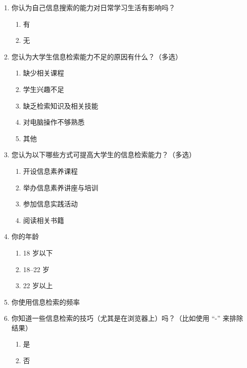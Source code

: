 \begin{enumerate}[leftmargin=*]
    \item 你认为自己信息搜索的能力对日常学习生活有影响吗？
      \begin{enumerate}[label=\Alph*., itemsep=0pt]
        \item 有
        \item 无
      \end{enumerate}

    \item 您认为大学生信息检索能力不足的原因有什么？（多选）
      \begin{enumerate}[label=\Alph*., itemsep=0pt]
        \item 缺少相关课程
        \item 学生兴趣不足
        \item 缺乏检索知识及相关技能
        \item 对电脑操作不够熟悉
        \item 其他
      \end{enumerate}

    \item 您认为以下哪些方式可提高大学生的信息检索能力？（多选）
      \begin{enumerate}[label=\Alph*., itemsep=0pt]
        \item 开设信息素养课程
        \item 举办信息素养讲座与培训
        \item 参加信息实践活动
        \item 阅读相关书籍
      \end{enumerate}

    \item 你的年龄
      \begin{enumerate}[label=\Alph*., itemsep=0pt]
        \item 18 岁以下
        \item 18–22 岁
        \item 22 岁以上
      \end{enumerate}

    \item 你使用信息检索的频率

    \item 你知道一些信息检索的技巧（尤其是在浏览器上）吗？（比如使用 “-” 来排除结果）
      \begin{enumerate}[label=\Alph*., itemsep=0pt]
        \item 是
        \item 否
      \end{enumerate}


\end{enumerate}
